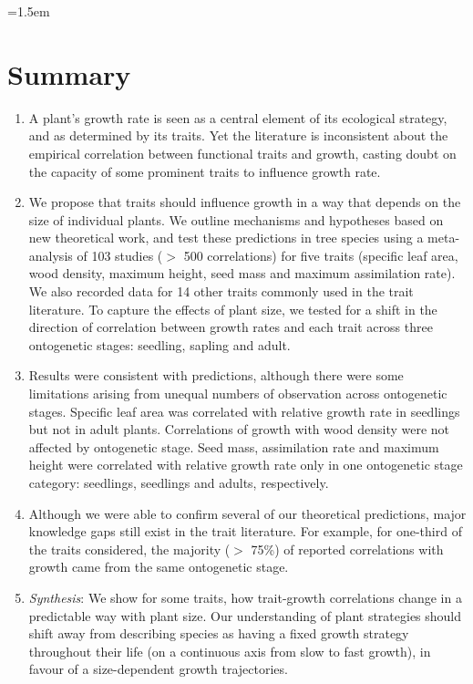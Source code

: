 \documentclass[a4paper,11pt]{article}
\date{}
\begin{document}
\mstitlepage
\noindent
\parindent=1.5em
\addtolength{\parskip}{.3em}
\doublespacing
\linenumbers
\section{Summary}\label{abstract}
\begin{enumerate}
\def\labelenumi{\arabic{enumi}.}
\itemsep1pt\parskip0pt
\item A plant's growth rate is seen as a central element of its ecological strategy, and as determined by its traits. Yet the literature is inconsistent about the empirical correlation between functional traits and growth, casting doubt on the capacity of some prominent traits to influence growth rate.

\item We propose that traits should influence growth in a way that depends on the size of individual plants. We outline mechanisms and hypotheses based on new theoretical work, and test these predictions in tree species using a meta-analysis of 103 studies ($>$ 500 correlations) for five traits (specific leaf area, wood density, maximum height, seed mass and maximum assimilation rate). We also recorded data for 14 other traits commonly used in the trait literature. To capture the effects of plant size, we tested for a shift in the direction of correlation between growth rates and each trait across three ontogenetic stages: seedling, sapling and adult.

\item Results were consistent with predictions, although there were some limitations arising from unequal numbers of observation across ontogenetic stages. Specific leaf area was correlated with relative growth rate in seedlings but not in adult plants. Correlations of growth with wood density were not affected by ontogenetic stage. Seed mass, assimilation rate and maximum height were correlated with relative growth rate only in one ontogenetic stage category: seedlings, seedlings and adults, respectively.

\item Although we were able to confirm several of our theoretical predictions, major knowledge gaps still exist in the trait literature. For example, for one-third of the traits considered, the majority ($>$ 75\%) of reported correlations with growth came from the same ontogenetic stage.

\item {\it Synthesis}: We show for some traits, how trait-growth correlations change in a predictable way with plant size. Our understanding of plant strategies should shift away from describing species as having a fixed growth strategy throughout their life (on a continuous axis from slow to fast growth), in favour of a size-dependent growth trajectories.
\end{enumerate}
\end{document}
